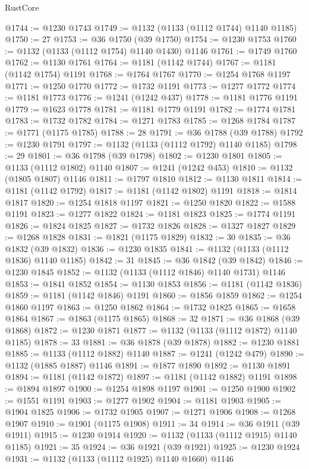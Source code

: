 \begin{lexlean}{RustCore}
\begin{coremodule}
@1744 := @1230 @1743
@1749 := @1132 (@1133 (@1112 @1744) @1140 @1185)
@1750 := 27
@1753 := @36 @1750 (@39 @1750)
@1754 := @1230 @1753
@1760 := @1132 (@1133 (@1112 @1754) @1140 @1430) @1146
@1761 := @1749 @1760
@1762 := @1130 @1761
@1764 := @1181 (@1142 @1744)
@1767 := @1181 (@1142 @1754) @1191
@1768 := @1764 @1767
@1770 := @1254 @1768 @1197
@1771 := @1250 @1770
@1772 := @1732 @1191
@1773 := @1277 @1772
@1774 := @1181 @1773
@1776 := @1241 (@1242 @437)
@1778 := @1181 @1776 @1191
@1779 := @1623 @1778
@1781 := @1181 @1779 @1191
@1782 := @1774 @1781
@1783 := @1732 @1782
@1784 := @1271 @1783
@1785 := @1268 @1784
@1787 := @1771 (@1175 @1785)
@1788 := 28
@1791 := @36 @1788 (@39 @1788)
@1792 := @1230 @1791
@1797 := @1132 (@1133 (@1112 @1792) @1140 @1185)
@1798 := 29
@1801 := @36 @1798 (@39 @1798)
@1802 := @1230 @1801
@1805 := @1133 (@1112 @1802) @1140
@1807 := @1241 (@1242 @453)
@1810 := @1132 (@1805 @1807) @1146
@1811 := @1797 @1810
@1812 := @1130 @1811
@1814 := @1181 (@1142 @1792)
@1817 := @1181 (@1142 @1802) @1191
@1818 := @1814 @1817
@1820 := @1254 @1818 @1197
@1821 := @1250 @1820
@1822 := @1588 @1191
@1823 := @1277 @1822
@1824 := @1181 @1823
@1825 := @1774 @1191
@1826 := @1824 @1825
@1827 := @1732 @1826
@1828 := @1327 @1827
@1829 := @1268 @1828
@1831 := @1821 (@1175 @1829)
@1832 := 30
@1835 := @36 @1832 (@39 @1832)
@1836 := @1230 @1835
@1841 := @1132 (@1133 (@1112 @1836) @1140 @1185)
@1842 := 31
@1845 := @36 @1842 (@39 @1842)
@1846 := @1230 @1845
@1852 := @1132 (@1133 (@1112 @1846) @1140 @1731) @1146
@1853 := @1841 @1852
@1854 := @1130 @1853
@1856 := @1181 (@1142 @1836)
@1859 := @1181 (@1142 @1846) @1191
@1860 := @1856 @1859
@1862 := @1254 @1860 @1197
@1863 := @1250 @1862
@1864 := @1732 @1825
@1865 := @1658 @1864
@1867 := @1863 (@1175 @1865)
@1868 := 32
@1871 := @36 @1868 (@39 @1868)
@1872 := @1230 @1871
@1877 := @1132 (@1133 (@1112 @1872) @1140 @1185)
@1878 := 33
@1881 := @36 @1878 (@39 @1878)
@1882 := @1230 @1881
@1885 := @1133 (@1112 @1882) @1140
@1887 := @1241 (@1242 @479)
@1890 := @1132 (@1885 @1887) @1146
@1891 := @1877 @1890
@1892 := @1130 @1891
@1894 := @1181 (@1142 @1872)
@1897 := @1181 (@1142 @1882) @1191
@1898 := @1894 @1897
@1900 := @1254 @1898 @1197
@1901 := @1250 @1900
@1902 := @1551 @1191
@1903 := @1277 @1902
@1904 := @1181 @1903
@1905 := @1904 @1825
@1906 := @1732 @1905
@1907 := @1271 @1906
@1908 := @1268 @1907
@1910 := @1901 (@1175 @1908)
@1911 := 34
@1914 := @36 @1911 (@39 @1911)
@1915 := @1230 @1914
@1920 := @1132 (@1133 (@1112 @1915) @1140 @1185)
@1921 := 35
@1924 := @36 @1921 (@39 @1921)
@1925 := @1230 @1924
@1931 := @1132 (@1133 (@1112 @1925) @1140 @1660) @1146

\end{coremodule}
\end{lexlean}
